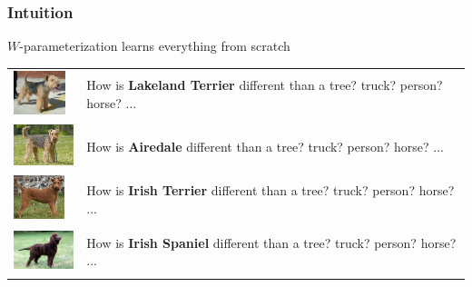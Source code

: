 
\begin{frame}
\frametitle{Intuition}

$W$-parameterization learns everything from scratch


\vspace{0.1in}
\begin{tabular}{m{0.7in}m{3.7in}}
    \includegraphics[height=0.5in]{img/Lakeland_Terrier} & How is \textbf{Lakeland Terrier} different than a tree? truck? person? horse? ... \\
    \includegraphics[height=0.5in]{img/Airedale} & How is \textbf{Airedale} different than a tree? truck? person? horse? ... \\
    \includegraphics[height=0.5in]{img/Irish-Terrier} & How is \textbf{Irish Terrier} different than a tree? truck? person? horse? ... \\
    \includegraphics[height=0.5in]{img/water_spaniel} & How is \textbf{Irish Spaniel} different than a tree? truck? person? horse? ... \\
\end{tabular}
\end{frame}

